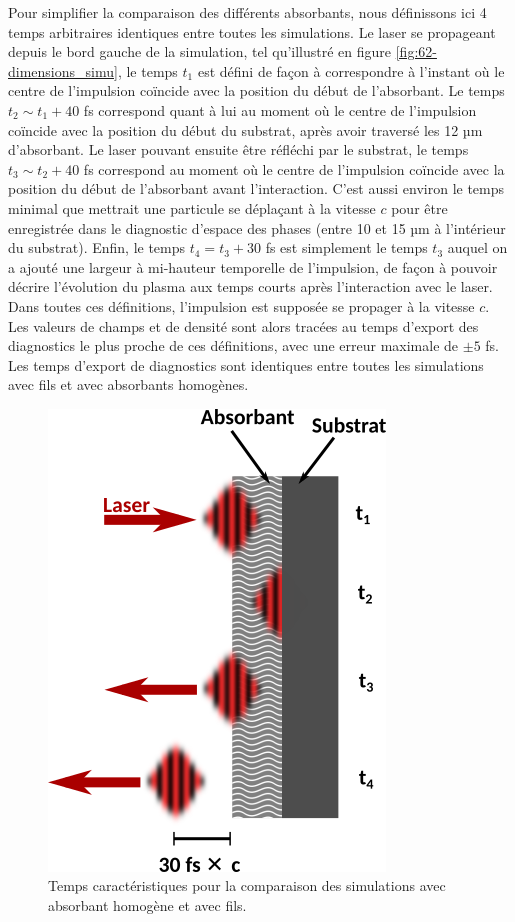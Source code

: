 \begin{refsection}
Pour simplifier la comparaison des différents absorbants, nous définissons ici 4 temps arbitraires identiques entre toutes les simulations. Le laser se propageant depuis le bord gauche de la simulation, tel qu'illustré en figure \ref{fig:62-dimensions_simu}, le temps $t_1$ est défini de façon à correspondre à l'instant où le centre de l'impulsion coïncide avec la position du début de l'absorbant. Le temps $t_2 \sim t_1 + 40$ fs correspond quant à lui au moment où le centre de l'impulsion coïncide avec la position du début du substrat, après avoir traversé les 12 µm d'absorbant. Le laser pouvant ensuite être réfléchi par le substrat, le temps $t_3 \sim t_2 + 40$ fs correspond au moment où le centre de l'impulsion coïncide avec la position du début de l'absorbant avant l'interaction. C'est aussi environ le temps minimal que mettrait une particule se déplaçant à la vitesse $c$ pour être enregistrée dans le diagnostic d'espace des phases (entre 10 et 15 µm à l'intérieur du substrat). Enfin, le temps $t_4 = t_3 + 30$ fs est simplement le temps $t_3$ auquel on a ajouté une largeur à mi-hauteur temporelle de l'impulsion, de façon à pouvoir décrire l'évolution du plasma aux temps courts après l'interaction avec le laser. Dans toutes ces définitions, l'impulsion est supposée se propager à la vitesse $c$. Les valeurs de champs et de densité sont alors tracées au temps d'export des diagnostics le plus proche de ces définitions, avec une erreur maximale de $\pm 5$ fs. Les temps d'export de diagnostics sont identiques entre toutes les simulations avec fils et avec absorbants homogènes.

\begin{figure}[hbtp]
	\centering
	\includegraphics[width=0.30\linewidth]{6-opti_numerique/definition_temps.png}
	\caption{Temps caractéristiques pour la comparaison des simulations avec absorbant homogène et avec fils.}
	\label{fig:62-temps_carac}
\end{figure}



\end{refsection}
